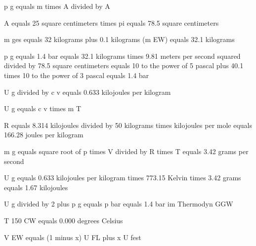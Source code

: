 p g equals m times A divided by A

A equals 25 square centimeters times pi equals 78.5 square centimeters

m ges equals 32 kilograms plus 0.1 kilograms (m EW) equals 32.1 kilograms

p g equals 1.4 bar equals 32.1 kilograms times 9.81 meters per second squared divided by 78.5 square centimeters equals 10 to the power of 5 pascal plus 40.1 times 10 to the power of 3 pascal equals 1.4 bar

U g divided by c v equals 0.633 kilojoules per kilogram

U g equals c v times m T

R equals 8.314 kilojoules divided by 50 kilograms times kilojoules per mole equals 166.28 joules per kilogram

m g equals square root of p times V divided by R times T equals 3.42 grams per second

U g equals 0.633 kilojoules per kilogram times 773.15 Kelvin times 3.42 grams equals 1.67 kilojoules

U g divided by 2 plus p g equals p bar equals 1.4 bar im Thermodyn GGW

T 150 CW equals 0.000 degrees Celsius

V EW equals (1 minus x) U FL plus x U fest